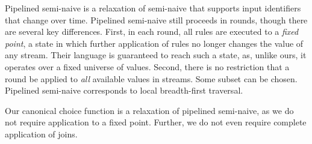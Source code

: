 Pipelined semi-naive is a relaxation of semi-naive that supports input identifiers that change over time.  Pipelined semi-naive still proceeds in rounds, though there are several key differences.  First, in each round, all rules are executed to a {\em fixed point}, a state in which further application of rules no longer changes the value of any stream.  Their language is guaranteed to reach such a state, as, unlike ours, it operates over a fixed universe of values.  Second, there is no restriction that a round be applied to {\em all} available values in streams.  Some subset can be chosen.  Pipelined semi-naive corresponds to local breadth-first traversal.

Our canonical choice function is a relaxation of pipelined semi-naive, as we do not require application to a fixed point.  Further, we do not even require complete application of joins.


